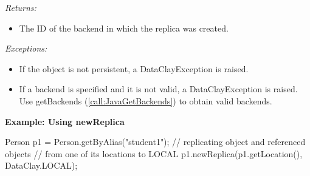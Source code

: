 \begin{dBox}
{\it Returns:}

\begin{itemize}
    \item The ID of the backend in which the replica was created. 
\end{itemize}

{\it Exceptions:}

\begin{itemize}
    \item If the object is not persistent, a DataClayException is raised.
    \item If a backend is specified and it is not valid, a DataClayException is raised. Use getBackends (\ref{call:JavaGetBackends}) to obtain valid backends.
\end{itemize}

\end{dBox}

\begin{tBox}
\textcolor{basecolor} {\bf Example: Using newReplica}
\begin{java}
Person p1 = Person.getByAlias("student1");
// replicating object and referenced objects
// from one of its locations to LOCAL
p1.newReplica(p1.getLocation(), DataClay.LOCAL);
\end{java}
\end{tBox}



